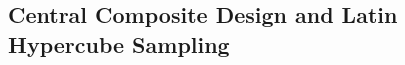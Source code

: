 \documentclass{article}
\begin{document}
\pagebreak
\subsection {Central Composite Design and Latin Hypercube Sampling}

\begin{figure}[htbp]
  \centering
  \begin{bigbox}
	\begin{small}
	
 	\end{small}
  \end{bigbox}
   \label{fig:ccd_lhs}
\end{figure}

%
\end{document}
